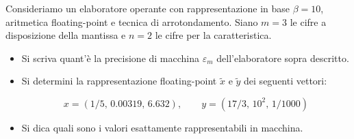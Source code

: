 Consideriamo un elaboratore operante con rappresentazione in base
$\beta=10$, aritmetica floating-point e tecnica di arrotondamento.
Siano  $m=3$ le cifre a disposizione della mantissa e $n=2$ le
cifre per la  caratteristica.


\begin{itemize}
\item Si scriva
quant'\`{e} la precisione di macchina $\varepsilon_m$
dell'elaboratore sopra descritto.
\item
Si determini la rappresentazione floating-point $\widetilde{x}$ e
$\widetilde{y}$ dei seguenti vettori:

$$x=(1/5,\,  0.00319,\, 6.632), \quad \quad  y=(17/3, \, 10^{2},\,
1/1000)$$
\item
Si dica quali sono i valori esattamente rappresentabili in
macchina.
\end{itemize}
